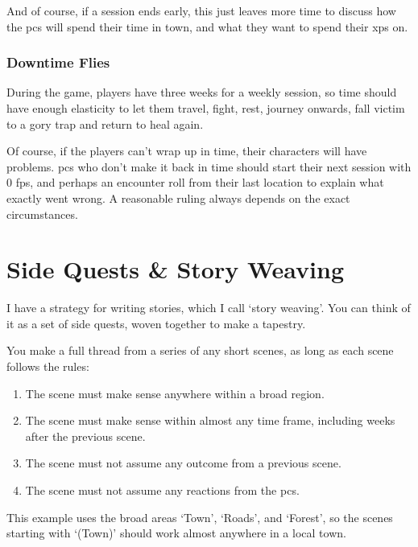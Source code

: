 \begin{multicols}{2}
And of course, if a session ends early, this just leaves more time to discuss how the \glspl{pc} will spend their time in town, and what they want to spend their \glspl{xp} on.

\subsubsection{Downtime Flies}

During the game, players have three weeks for a weekly session, so time should have enough elasticity to let them travel, fight, rest, journey onwards, fall victim to a gory trap and return to heal again.

Of course, if the players can't wrap up in time, their characters will have problems.
\Glspl{pc} who don't make it back in time should start their next session with 0 \glspl{fp}, and perhaps an encounter roll from their last location to explain what exactly went wrong.
A reasonable ruling always depends on the exact circumstances.

\end{multicols}

\section{Side Quests \& Story Weaving}

\label{sidequests}

\begin{multicols}{2}
\noindent
I have a strategy for writing stories, which I call `story weaving'.
You can think of it as a set of side quests, woven together to make a tapestry.

You make a full thread from a series of any short scenes, as long as each scene follows the rules:

\begin{enumerate}
  \item
  The scene must make sense anywhere within a broad region.
  \item
  The scene must make sense within almost any time frame, including weeks after the previous scene.
  \item
  The scene must not assume any outcome from a previous scene.
  \item
  The scene must not assume any reactions from the \glspl{pc}.
\end{enumerate}

This example uses the broad areas `Town', `Roads', and `Forest', so the scenes starting with `(Town)' should work almost anywhere in a local town.

\end{multicols}

